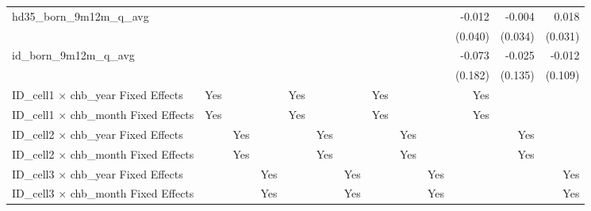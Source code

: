 \begin{tabular}{lrrrrrrrrrrrr}
hd35\_born\_9m12m\_q\_avg                   &              &              &              &              &              &              &              &              &              &       -0.012 &       -0.004 &        0.018 \\ 
                                            &              &              &              &              &              &              &              &              &              &      (0.040) &      (0.034) &      (0.031) \\ 
id\_born\_9m12m\_q\_avg                     &              &              &              &              &              &              &              &              &              &       -0.073 &       -0.025 &       -0.012 \\ 
                                            &              &              &              &              &              &              &              &              &              &      (0.182) &      (0.135) &      (0.109) \\ 
\midrule
ID\_cell1 $\times$ chb\_year Fixed Effects  &          Yes &              &              &          Yes &              &              &          Yes &              &              &          Yes &              &              \\ 
ID\_cell1 $\times$ chb\_month Fixed Effects &          Yes &              &              &          Yes &              &              &          Yes &              &              &          Yes &              &              \\ 
ID\_cell2 $\times$ chb\_year Fixed Effects  &              &          Yes &              &              &          Yes &              &              &          Yes &              &              &          Yes &              \\ 
ID\_cell2 $\times$ chb\_month Fixed Effects &              &          Yes &              &              &          Yes &              &              &          Yes &              &              &          Yes &              \\ 
ID\_cell3 $\times$ chb\_year Fixed Effects  &              &              &          Yes &              &              &          Yes &              &              &          Yes &              &              &          Yes \\ 
ID\_cell3 $\times$ chb\_month Fixed Effects &              &              &          Yes &              &              &          Yes &              &              &          Yes &              &              &          Yes \\ 

\end{tabular}
